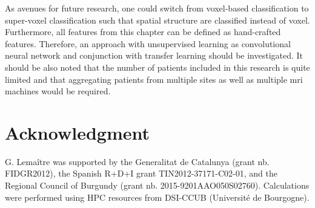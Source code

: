\documentclass[final,3p,times,twocolumn]{elsarticle}
\begin{document}
As avenues for future research, one could switch from voxel-based
classification to super-voxel classification such that spatial structure are
classified instead of voxel. Furthermore, all features from this chapter can
be defined as hand-crafted features. Therefore, an approach with unsupervised
learning as convolutional neural network and conjunction with transfer learning
should be investigated. It should be also noted that the number of patients
included in this research is quite limited and that aggregating patients from
multiple sites as well as multiple \ac{mri} machines would be required.

\section*{Acknowledgment}

G. Lema\^itre was supported by the Generalitat de Catalunya (grant
nb. FIDGR2012), the Spanish R+D+I grant TIN2012-37171-C02-01, and the
Regional Council of Burgundy (grant nb. 2015-9201AAO050S02760).
Calculations were performed using HPC resources from DSI-CCUB
(Universit\'e de Bourgogne).

 

\end{document}
